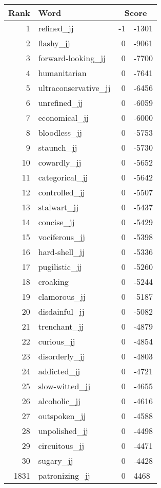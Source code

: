 \begin{longtable}[!htbp]{| rlr@{.}l |}
    \hline
    \textbf{Rank} & \textbf{Word} & \multicolumn{2}{c|}{\textbf{Score}} \\
    \hline
    \endhead
    1 & refined\_jj & -1 & -1301 \\
    2 & flashy\_jj & 0 & -9061 \\
    3 & forward-looking\_jj & 0 & -7700 \\
    4 & humanitarian & 0 & -7641 \\
    5 & ultraconservative\_jj & 0 & -6456 \\
    6 & unrefined\_jj & 0 & -6059 \\
    7 & economical\_jj & 0 & -6000 \\
    8 & bloodless\_jj & 0 & -5753 \\
    9 & staunch\_jj & 0 & -5730 \\
    10 & cowardly\_jj & 0 & -5652 \\
    11 & categorical\_jj & 0 & -5642 \\
    12 & controlled\_jj & 0 & -5507 \\
    13 & stalwart\_jj & 0 & -5437 \\
    14 & concise\_jj & 0 & -5429 \\
    15 & vociferous\_jj & 0 & -5398 \\
    16 & hard-shell\_jj & 0 & -5336 \\
    17 & pugilistic\_jj & 0 & -5260 \\
    18 & croaking & 0 & -5244 \\
    19 & clamorous\_jj & 0 & -5187 \\
    20 & disdainful\_jj & 0 & -5082 \\
    21 & trenchant\_jj & 0 & -4879 \\
    22 & curious\_jj & 0 & -4854 \\
    23 & disorderly\_jj & 0 & -4803 \\
    24 & addicted\_jj & 0 & -4721 \\
    25 & slow-witted\_jj & 0 & -4655 \\
    26 & alcoholic\_jj & 0 & -4616 \\
    27 & outspoken\_jj & 0 & -4588 \\
    28 & unpolished\_jj & 0 & -4498 \\
    29 & circuitous\_jj & 0 & -4471 \\
    30 & sugary\_jj & 0 & -4428 \\
    1831 & patronizing\_jj & 0 & 4468 \\

\end{longtable}
